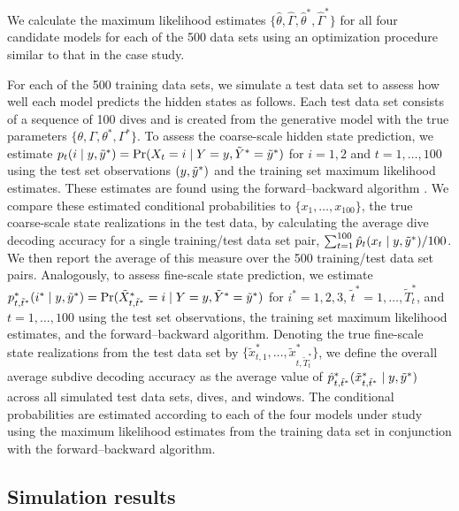 We calculate the maximum likelihood estimates $\{\hat \theta, \hat \Gamma, \hat \theta^*, \hat \Gamma^*\}$ for all four candidate models for each of the 500 data sets using an optimization procedure similar to that in the case study.

For each of the 500 training data sets, we simulate a test data set to assess how well each model predicts the hidden states as follows. Each test data set consists of a sequence of 100 dives and is created from the generative model with the true parameters $\{\theta, \Gamma, \theta^*, \Gamma^*\}$. To assess the coarse-scale hidden state prediction, we estimate $p_t(i \mid y,\tilde{y}^*) = \Pr(X_t=i \mid Y=y,\tilde{Y}^*=\tilde{y}^*)$ for $i=1,2$ and $t=1,\ldots,100$ using the test set observations $(y,\tilde{y}^*)$ and the training set maximum likelihood estimates. These estimates are found using the forward--backward algorithm \citep{Zucchini:2016}. We compare these estimated conditional probabilities to $\{x_1,\ldots,x_{100}\}$, the true coarse-scale state realizations in the test data, by calculating the average dive decoding accuracy for a single training/test data set pair, $\sum_{t=1}^{100} \hat{p}_t(x_t \mid y,\tilde{y}^*)/100$. We then report the average of this measure over the 500 training/test data set pairs. 
Analogously, to assess fine-scale state prediction, we estimate $p^*_{t,\tilde t^*}(i^* \mid y,\tilde{y}^*) = \Pr(\tilde X^*_{t,\tilde t^*}=i \mid Y=y,\tilde{Y}^*=\tilde{y}^*)$ for $i^*=1,2,3$, $\tilde t^* = 1,\ldots,\tilde T^*_t$, and $t=1,\ldots,100$ using the test set observations, the training set maximum likelihood estimates, and the forward--backward algorithm. Denoting the true fine-scale state realizations from the test data set by $\{\tilde x^*_{t,1},\ldots,\tilde x^*_{t,\tilde T^*_t}\}$, we define the overall average subdive decoding accuracy as the average value of $\hat{p}^*_{t,\tilde t^*}(\tilde x^*_{t,\tilde t^*} \mid y,\tilde{y}^*)$ across all simulated test data sets, dives, and windows. The conditional probabilities are estimated according to each of the four models under study using the maximum likelihood estimates from the training data set in conjunction with the forward--backward algorithm.

\subsection{Simulation results}

